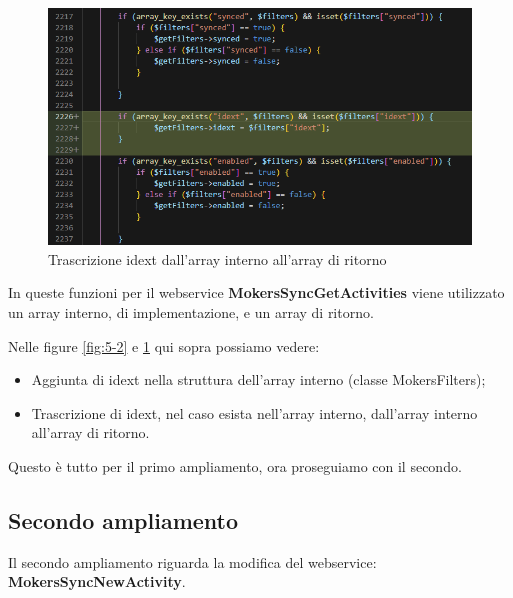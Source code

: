 \begin{figure}[!h] 
	\centering
	\includegraphics[scale = 0.5]{immagini/webservices/ampliamenti/1ampl_mokers_getidext.png}
	\caption{Trascrizione idext dall'array interno all'array di ritorno}
	\label{fig:5-3}
\end{figure}
\newspace
\newspace
\begin{flushleft}
	In queste funzioni per il webservice \textbf{MokersSyncGetActivities} viene utilizzato un array interno, di implementazione, e un array di ritorno.
	
	Nelle figure \ref{fig:5-2} e \ref{fig:5-3}  qui sopra possiamo vedere:
	\begin{itemize}
		\item Aggiunta di idext nella struttura dell'array interno (classe MokersFilters);
		\item Trascrizione di idext, nel caso esista nell'array interno, dall'array interno all'array di ritorno.
	\end{itemize}
	
	Questo è tutto per il primo ampliamento, ora proseguiamo con il secondo.
\end{flushleft}
\newpage

\subsection{Secondo ampliamento}
Il secondo ampliamento riguarda la modifica del webservice: \\ \textbf{MokersSyncNewActivity}.

